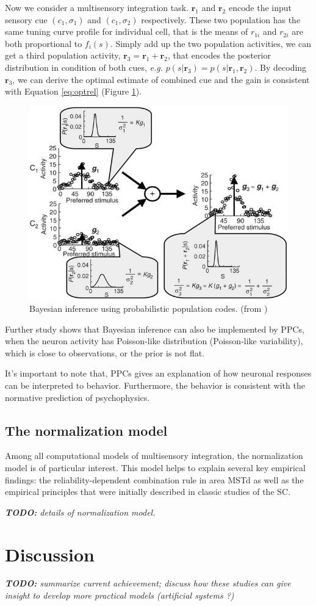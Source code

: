 \documentclass{article}[11pt]
\newcommand{\TODO}[1]{\emph{\small{{\bf TODO: } #1}}}
\newcommand{\eg}{\textit{e.g. }}
\begin{document}
Now we consider a multisensory integration task. $\mathbf{r}_1$ and $\mathbf{r}_2$ encode the input sensory cue $(c_1, \sigma_1)$ and $(c_1, \sigma_2)$ respectively. These two population has the same tuning curve profile for individual cell, that is the means of $r_{1i}$ and $r_{2i}$ are both proportional to $f_i(s)$. Simply add up the two population activities, we can get a third population activity, $\mathbf{r}_3 = \mathbf{r}_1 + \mathbf{r}_2$, that encodes the posterior distribution in condition of both cues, \eg $p(s|\mathbf{r}_3) = p(s|\mathbf{r}_1,\mathbf{r}_2)$. By decoding $\mathbf{r}_3$, we can derive the optimal estimate of combined cue and the gain is consistent with Equation \ref{eq:optrel} (Figure \ref{fig:infer}).

\begin{figure}[tpb]
  \centering
  \includegraphics[width=\textwidth]{infer}
  \caption{Bayesian inference using probabilistic population codes. (from \cite{ma_bayesian_2006})}
  \label{fig:infer}
\end{figure}

Further study shows that Bayesian inference can also be implemented by PPCs, when the neuron activity has Poisson-like distribution (Poisson-like variability), which is close to observations, or the prior is not flat.

It's important to note that, PPCs gives an explanation of how neuronal responses can be interpreted to behavior. Furthermore, the behavior is consistent with the normative prediction of psychophysics.

\subsection{The normalization model}
Among all computational models of multisensory integration, the normalization model \cite{ohshiro_normalization_2011} is of particular interest. This model helps to explain several key empirical findings: the reliability-dependent combination rule in area MSTd as well as
the empirical principles that were initially described in classic studies of the SC.

\TODO{details of normalization model.}

\section{Discussion}
\TODO{summarize current achievement; discuss how these studies can give insight to develop more practical models (artificial systems ?)}



\end{document}
